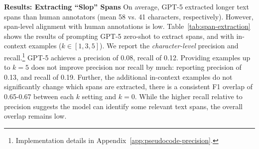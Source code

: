 \documentclass{article} %
\begin{document}

\textbf{Results: Extracting ``Slop'' Spans}
On average, GPT-5 extracted longer text spans than human annotators (mean 58 vs. 41 characters, respectively). However, span-level alignment with human annotations is low. Table~\ref{tab:span-extraction} shows the results of prompting GPT-5 zero-shot to extract spans, and with in-context examples ($k \in [1, 3, 5]$). We report the \textit{character-level} precision and recall.\footnote{Implementation details in Appendix~\ref{app:pseudocode-precision}.} GPT-5 achieves a precision of 0.08, recall of 0.12. Providing examples up to $k=5$ does not improve precision nor recall by much: reporting precision of 0.13, and recall of 0.19. Further, the additional in-context examples do not significantly change which spans are extracted, there is a consistent F1 overlap of 0.65-0.67 between each $k$ setting and $k=0$. While the higher recall relative to precision suggests the model can identify some relevant text spans, the overall overlap remains low.
\end{document}
